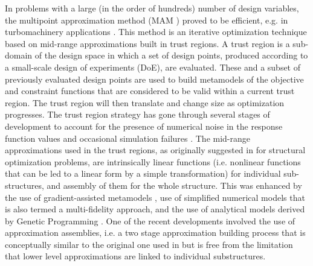 \documentclass{llncs}
\begin{document}
In problems with a large (in the order of hundreds) number of design variables, the multipoint approximation method (MAM \cite{Toropov1989,Toropov1992,ToropovFilatov1993}) proved to be efficient, e.g. in turbomachinery applications \cite{ShahparPolynkinToropov2008,PolynkinToropovShahpar2008,PolynkinToropovShahpar2010} . This method is an iterative optimization technique based on mid-range approximations built in trust regions. A trust region is a sub-domain of the design space in which a set of design points, produced according to a small-scale design of experiments (DoE), are evaluated. These and a subset of previously evaluated design points are used to build metamodels of the objective and constraint functions that are considered to be valid within a current trust region. The trust region will then translate and change size as optimization progresses. The trust region strategy has gone through several stages of development to account for the presence of numerical noise in the response function values \cite{KeulenToropovMarkine1996,ToropovKeulenMarkine1996} and occasional simulation failures \cite{ToropovMarkineHolden1999}. The mid-range approximations used in the trust regions, as originally suggested in \cite{Toropov1989} for structural optimization problems, are intrinsically linear functions (i.e. nonlinear functions that can be led to a linear form by a simple transformation) for individual sub-structures, and assembly of them for the whole structure. This was enhanced by the use of gradient-assisted metamodels \cite{ToropovFilatov1993}, use of simplified numerical models that is also termed a multi-fidelity approach,\cite{ToropovMarkine1996} and the use of analytical models derived by Genetic Programming \cite{ToropovAlvarez1998}. One of the recent developments \cite{PolynkinToropov2012} involved the use of approximation assemblies, i.e. a two stage approximation building process that is conceptually similar to the original one used in \cite{Toropov1989} but is free from the limitation that lower level approximations are linked to individual substructures.
\end{document}

